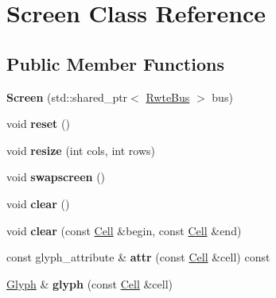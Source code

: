 \hypertarget{classScreen}{}\section{Screen Class Reference}
\label{classScreen}
\subsection*{Public Member Functions}
\begin{DoxyCompactItemize}
\item 
\mbox{\label{classScreen_a92d62569a44da1c0aca37fb79469b8c9}} 
{\bfseries Screen} (std\+::shared\+\_\+ptr$<$ \mbox{\hyperlink{classBus}{Rwte\+Bus}} $>$ bus)
\item 
\mbox{\label{classScreen_a4cdc0d35473a5b1fac24be4851cff5b4}} 
void {\bfseries reset} ()
\item 
\mbox{\label{classScreen_a411e3794619152a6e46c42f1ccae192b}} 
void {\bfseries resize} (int cols, int rows)
\item 
\mbox{\label{classScreen_aa93edecd51530e2d5d9faeda94223449}} 
void {\bfseries swapscreen} ()
\item 
\mbox{\label{classScreen_a35e74266b2a04e37b354ceff7a5f1031}} 
void {\bfseries clear} ()
\item 
\mbox{\label{classScreen_afd6ecaa55d8c653966e9cf37b53f22e4}} 
void {\bfseries clear} (const \mbox{\hyperlink{structCell}{Cell}} \&begin, const \mbox{\hyperlink{structCell}{Cell}} \&end)
\item 
\mbox{\label{classScreen_ae3f1dbb700586825599917702bd9ee8a}} 
const glyph\+\_\+attribute \& {\bfseries attr} (const \mbox{\hyperlink{structCell}{Cell}} \&cell) const
\item 
\mbox{\label{classScreen_acd3534ab6df7681aef9733df22ca5490}} 
\mbox{\hyperlink{structGlyph}{Glyph}} \& {\bfseries glyph} (const \mbox{\hyperlink{structCell}{Cell}} \&cell)
\item 
\mbox{\label{classScreen_a61a3cdac7647a1809b89df83c9d6975c}} 

\end{DoxyCompactItemize}
